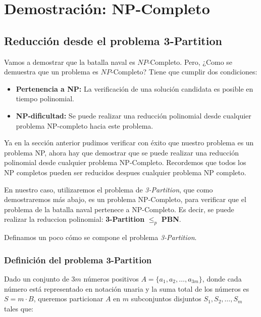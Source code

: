 \section{Demostración: NP-Completo}


\subsection*{Reducción desde el problema 3-Partition}

Vamos a demostrar que la batalla naval es $NP$-Completo. Pero, ¿Como se demuestra que un problema es $NP$-Completo? Tiene que cumplir dos condiciones: 

\begin{itemize}
    \item \textbf{Pertenencia a NP:} La verificación de una solución candidata es posible en tiempo polinomial.
    \item \textbf{NP-dificultad:} Se puede realizar una reducción polinomial desde cualquier problema NP-completo hacia este problema.
\end{itemize}

Ya en la sección anterior pudimos verificar con éxito que nuestro problema es un problema NP, ahora hay que demostrar que se puede realizar una reducción polinomial desde cualquier problema NP-Completo. Recordemos que todos los NP completos pueden ser reducidos despues cualquier problema NP completo. 

En nuestro caso, utilizaremos el problema de \textit{3-Partition}, que como demostraremos más abajo, es un problema NP-Completo, para verificar que el problema de la batalla naval pertenece a NP-Completo. Es decir, se puede realizar la reduccion polinomial: \textbf{3-Partition} $\leq_p$ \textbf{PBN}.

Definamos un poco cómo se compone el problema \textit{3-Partition}.

\subsubsection*{Definición del problema 3-Partition}

Dado un conjunto de \(3m\) números positivos \(A = \{a_1, a_2, \dots, a_{3m}\}\), donde cada número está representado en notación unaria y la suma total de los números es \(S = m \cdot B\), queremos particionar \(A\) en \(m\) subconjuntos disjuntos \(S_1, S_2, \dots, S_m\) tales que:

